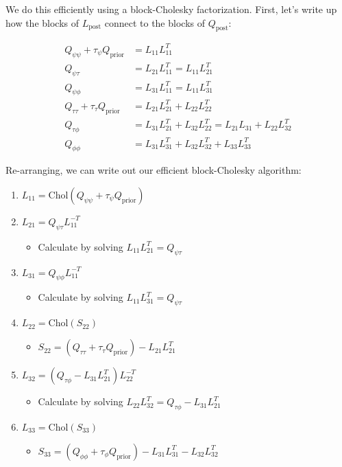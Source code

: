 \documentclass[
  letterpaper,
  DIV=11,
  numbers=noendperiod]{scrartcl}
\providecommand{\tightlist}{%
  \setlength{\itemsep}{0pt}\setlength{\parskip}{0pt}}\usepackage{longtable,booktabs,array}
\begin{document}
We do this efficiently using a block-Cholesky factorization. First,
let's write up how the blocks of \(L_\text{post}\) connect to the blocks
of \(Q_\text{post}\):

\[
\begin{aligned}
Q_{\psi\psi} + \tau_\psi Q_\text{prior} &= L_{11}L_{11}^T \\
Q_{\psi\tau} &=L_{21}L_{11}^T = L_{11}L_{21}^T \\
Q_{\psi\phi} &= L_{31}L_{11}^T = L_{11}L_{31}^T \\
Q_{\tau\tau} + \tau_\tau Q_\text{prior} &= L_{21}L_{21}^T + L_{22}L_{22}^T \\
Q_{\tau\phi} &= L_{31}L_{21}^T + L_{32}L_{22}^T = L_{21}L_{31} + L_{22}L_{32}^T \\
Q_{\phi\phi} &= L_{31}L_{31}^T + L_{32}L_{32}^T + L_{33}L_{33}^T
\end{aligned}
\]

Re-arranging, we can write out our efficient block-Cholesky algorithm:

\begin{enumerate}
\def\labelenumi{\arabic{enumi}.}
\tightlist
\item
  \(L_{11} = \mathrm{Chol}(Q_{\psi\psi} + \tau_\psi Q_\text{prior})\)
\item
  \(L_{21} = Q_{\psi\tau}L_{11}^{-T}\)

  \begin{itemize}
  \tightlist
  \item
    Calculate by solving \(L_{11}L_{21}^T = Q_{\psi\tau}\)
  \end{itemize}
\item
  \(L_{31} = Q_{\psi\phi}L_{11}^{-T}\)

  \begin{itemize}
  \tightlist
  \item
    Calculate by solving \(L_{11}L_{31}^T = Q_{\psi\tau}\)
  \end{itemize}
\item
  \(L_{22} = \mathrm{Chol}(S_{22})\)

  \begin{itemize}
  \tightlist
  \item
    \(S_{22} = \left(Q_{\tau\tau} + \tau_\tau Q_\text{prior}\right) - L_{21}L_{21}^T\)
  \end{itemize}
\item
  \(L_{32} = \left(Q_{\tau\phi} - L_{31}L_{21}^T\right)L_{22}^{-T}\)

  \begin{itemize}
  \tightlist
  \item
    Calculate by solving
    \(L_{22}L_{32}^T = Q_{\tau\phi} - L_{31}L_{21}^T\)
  \end{itemize}
\item
  \(L_{33} = \mathrm{Chol}(S_{33})\)

  \begin{itemize}
  \tightlist
  \item
    \(S_{33} = \left( Q_{\phi\phi} + \tau_\phi Q_\text{prior} \right) - L_{31}L_{31}^T - L_{32}L_{32}^T\)
  \end{itemize}
\end{enumerate}
\end{document}
